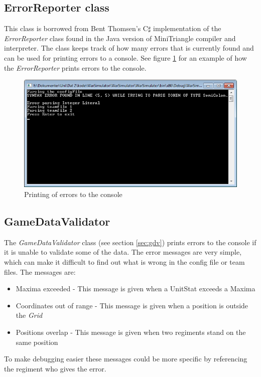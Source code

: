 	\subsection{ErrorReporter class}
		This class is borrowed from Bent Thomsen's \cite{triangle} C$\sharp$ implementation of the {\it ErrorReporter} class found in the 
		Java version of MiniTriangle compiler and interpreter. The class keeps track of how many errors that is currently found and can be used for 
		printing errors to a console. See figure \ref{fig:prterr} for an example of how the {\it ErrorReporter} prints errors to the console.
		\begin{figure}
			\includegraphics[scale=0.8]{rapport/7/figures/errorreporterprint}
			\caption{Printing of errors to the console}
			\label{fig:prterr}
		\end{figure}
	
	\subsection{GameDataValidator}
		The {\it GameDataValidator} class (see section \ref{sec:gdv}) prints errors to the console if it is unable to validate some of the data. 
		The error messages are very simple, which can make it difficult to find out what is wrong in the config file or team files. 
		The messages are:
		\begin{itemize}
			\item Maxima exceeded - This message is given when a UnitStat exceeds a Maxima
			\item Coordinates out of range - This message is given when a position is outside the {\it Grid}
			\item Positions overlap - This message is given when two regiments stand on the same position
		\end{itemize}
		To make debugging easier these messages could be more specific by referencing the regiment who gives the error.
		
	
		
		